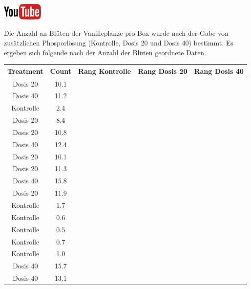 \documentclass[a4paper, 10pt]{scrartcl}\usepackage[]{graphicx}\usepackage[]{xcolor}
\newenvironment{knitrout}{}{} %
\begin{document}
\hfill\href{https://youtu.be/gC0SXiIG2wQ}{\includegraphics[width =
  2cm]{img/youtube}} %
\hspace{2Ex}




Die Anzahl an Bl{\"u}ten der Vanilleplanze pro Box wurde nach der Gabe von
zus{\"a}tzlichen Phosporl{\"o}sung (Kontrolle, Dosis 20 und Dosis 40) bestimmt. Es
ergeben sich folgende nach der Anzahl der Bl{\"u}ten geordnete Daten.

\begin{knitrout}
\color{fgcolor}\begin{table}[!h]
\centering
\begin{tabular}{ccccc}
\toprule
Treatment & Count & Rang Kontrolle & Rang Dosis 20 & Rang Dosis 40\\
\midrule
Dosis 20 & 10.1 &  &  & \\
Dosis 40 & 11.2 &  &  & \\
Kontrolle & 2.4 &  &  & \\
Dosis 20 & 8.4 &  &  & \\
Dosis 20 & 10.8 &  &  & \\
\addlinespace
Dosis 40 & 12.4 &  &  & \\
Dosis 20 & 10.1 &  &  & \\
Dosis 20 & 11.3 &  &  & \\
Dosis 40 & 15.8 &  &  & \\
Dosis 20 & 11.9 &  &  & \\
\addlinespace
Kontrolle & 1.7 &  &  & \\
Kontrolle & 0.6 &  &  & \\
Kontrolle & 0.5 &  &  & \\
Kontrolle & 0.7 &  &  & \\
Kontrolle & 1.0 &  &  & \\
\addlinespace
Dosis 40 & 15.7 &  &  & \\
Dosis 40 & 13.1 &  &  & \\
\bottomrule
\end{tabular}
\end{table}

\end{knitrout}
\end{document}
